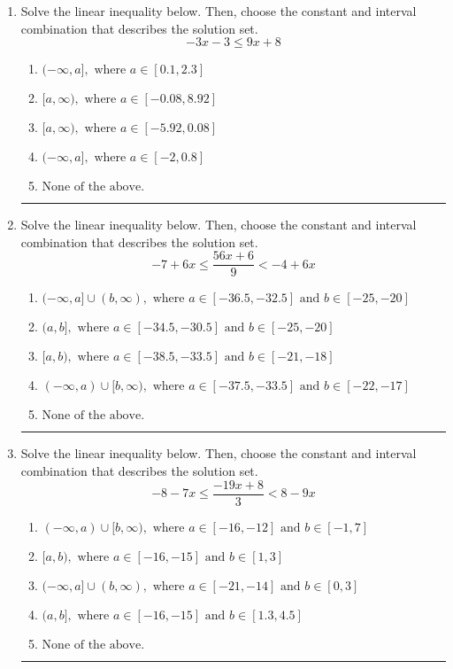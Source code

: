 \documentclass[14pt]{extbook}
\newcommand{\litem}[1]{\item#1\hspace*{-1cm}\rule{\textwidth}{0.4pt}}
\begin{document}
\begin{enumerate}
{\begin{enumerate}[label=\Alph*.]
\end{enumerate} }
\litem{
Solve the linear inequality below. Then, choose the constant and interval combination that describes the solution set.\[ -3x -3 \leq 9x + 8 \]\begin{enumerate}[label=\Alph*.]
\item \( (-\infty, a], \text{ where } a \in [0.1, 2.3] \)
\item \( [a, \infty), \text{ where } a \in [-0.08, 8.92] \)
\item \( [a, \infty), \text{ where } a \in [-5.92, 0.08] \)
\item \( (-\infty, a], \text{ where } a \in [-2, 0.8] \)
\item \( \text{None of the above}. \)

\end{enumerate} }
\litem{
Solve the linear inequality below. Then, choose the constant and interval combination that describes the solution set.\[ -7 + 6 x \leq \frac{56 x + 6}{9} < -4 + 6 x \]\begin{enumerate}[label=\Alph*.]
\item \( (-\infty, a] \cup (b, \infty), \text{ where } a \in [-36.5, -32.5] \text{ and } b \in [-25, -20] \)
\item \( (a, b], \text{ where } a \in [-34.5, -30.5] \text{ and } b \in [-25, -20] \)
\item \( [a, b), \text{ where } a \in [-38.5, -33.5] \text{ and } b \in [-21, -18] \)
\item \( (-\infty, a) \cup [b, \infty), \text{ where } a \in [-37.5, -33.5] \text{ and } b \in [-22, -17] \)
\item \( \text{None of the above.} \)

\end{enumerate} }
\litem{
Solve the linear inequality below. Then, choose the constant and interval combination that describes the solution set.\[ -8 - 7 x \leq \frac{-19 x + 8}{3} < 8 - 9 x \]\begin{enumerate}[label=\Alph*.]
\item \( (-\infty, a) \cup [b, \infty), \text{ where } a \in [-16, -12] \text{ and } b \in [-1, 7] \)
\item \( [a, b), \text{ where } a \in [-16, -15] \text{ and } b \in [1, 3] \)
\item \( (-\infty, a] \cup (b, \infty), \text{ where } a \in [-21, -14] \text{ and } b \in [0, 3] \)
\item \( (a, b], \text{ where } a \in [-16, -15] \text{ and } b \in [1.3, 4.5] \)
\item \( \text{None of the above.} \)

\end{enumerate} }
\end{enumerate}
\end{document}
